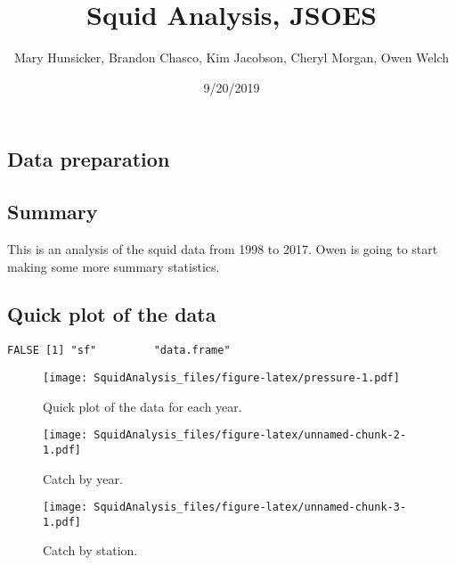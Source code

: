 \documentclass[
]{article}
\title{Squid Analysis, JSOES}
\author{Mary Hunsicker, Brandon Chasco, Kim Jacobson, Cheryl Morgan, Owen Welch}
\date{9/20/2019}
\begin{document}
\maketitle

\hypertarget{data-preparation}{%
\subsection{Data preparation}\label{data-preparation}}

\hypertarget{summary}{%
\subsection{Summary}\label{summary}}

This is an analysis of the squid data from 1998 to 2017. Owen is going
to start making some more summary statistics.

\hypertarget{quick-plot-of-the-data}{%
\subsection{Quick plot of the data}\label{quick-plot-of-the-data}}

\begin{verbatim}
FALSE [1] "sf"         "data.frame"
\end{verbatim}

\begin{figure}
\centering
\texttt{[image: SquidAnalysis\_files/figure-latex/pressure-1.pdf]}
\caption{Quick plot of the data for each year.}
\end{figure}

\begin{figure}
\centering
\texttt{[image: SquidAnalysis\_files/figure-latex/unnamed-chunk-2-1.pdf]}
\caption{Catch by year.}
\end{figure}

\begin{figure}
\centering
\texttt{[image: SquidAnalysis\_files/figure-latex/unnamed-chunk-3-1.pdf]}
\caption{Catch by station.}
\end{figure}
\end{document}
